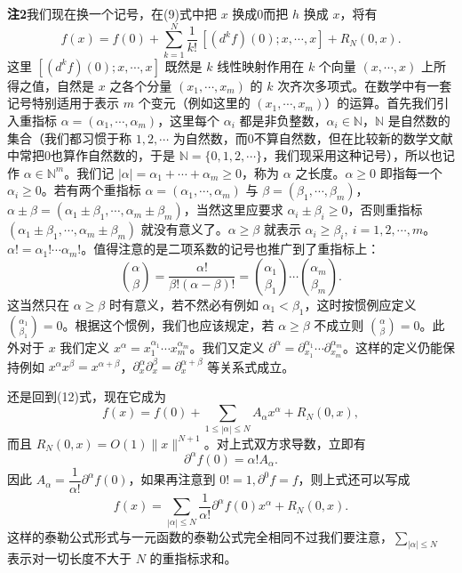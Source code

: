 \noindent\textbf{注2}\quad 我们现在换一个记号，在(9)式中把 $x$ 换成0而把 $h$ 换成 $x$，将有
\begin{equation}
 f(x)=f(0)+\sum_{k=1}^N\frac1{k!}\,[(d^kf)(0);x,\cdots,x]+R_N(0,x).
 \tag{12}
\end{equation}
这里 $[(d^kf)(0);x,\cdots,x]$ 既然是 $k$ 线性映射作用在 $k$ 个向量 $(x,\cdots,x)$ 上所得之值，自然是 $x$ 之各个分量 $(x_1,\cdots,x_m)$ 的 $k$ 次齐次多项式。在数学中有一套记号特别适用于表示 $m$ 个变元（例如这里的 $(x_1,\cdots,x_m)$）的运算。首先我们引入重指标 $\alpha=(\alpha_1,\cdots,\alpha_m)$，这里每个 $\alpha_i$ 都是非负整数，$\alpha_i\in\mathbb N$，$\mathbb N$ 是自然数的集合（我们都习惯于称 $1,2,\cdots$ 为自然数，而0不算自然数，但在比较新的数学文献中常把0也算作自然数的，于是 $\mathbb N=\{0,1,2,\cdots\}$，我们现采用这种记号），所以也记作 $\alpha\in\mathbb N^m$。我们记 $|\alpha|=\alpha_1+\cdots+\alpha_m\ge0$，称为 $\alpha$ 之长度。$\alpha\ge0$ 即指每一个 $\alpha_i\ge0$。若有两个重指标 $\alpha=(\alpha_1,\cdots,\alpha_m)$ 与 $\beta=(\beta_1,\cdots,\beta_m)$，$\alpha\pm\beta=(\alpha_1\pm\beta_1,\cdots,\alpha_m\pm\beta_m)$，当然这里应要求 $\alpha_i\pm\beta_i\ge0$，否则重指标 $(\alpha_1\pm\beta_1,\cdots,\alpha_m\pm\beta_m)$ 就没有意义了。$\alpha\ge\beta$ 就表示 $\alpha_i\ge\beta_i,\ i=1,2,\cdots,m$。$\alpha!=\alpha_1!\cdots\alpha_m!$。值得注意的是二项系数的记号也推广到了重指标上：
\[
 \binom{\alpha}{\beta}=\frac{\alpha!}{\beta!(\alpha-\beta)!}
 =\binom{\alpha_1}{\beta_1}\cdots\binom{\alpha_m}{\beta_m}.
\]
这当然只在 $\alpha\ge\beta$ 时有意义，若不然必有例如 $\alpha_1<\beta_1$，这时按惯例应定义 $\binom{\alpha_1}{\beta_1}=0$。根据这个惯例，我们也应该规定，若 $\alpha\ge\beta$ 不成立则 $\binom{\alpha}{\beta}=0$。此外对于 $x$ 我们定义 $x^\alpha=x_1^{\alpha_1}\cdots x_m^{\alpha_m}$。我们又定义 $\partial^\alpha=\partial_{x_1}^{\alpha_1}\cdots\partial_{x_m}^{\alpha_m}$。这样的定义仍能保持例如 $x^\alpha x^\beta=x^{\alpha+\beta}$，$\partial_x^\alpha\partial_x^\beta=\partial_x^{\alpha+\beta}$ 等关系式成立。

还是回到(12)式，现在它成为
\[
 f(x)=f(0)+\sum_{1\le|\alpha|\le N}A_\alpha x^\alpha+R_N(0,x),
\]
而且 $R_N(0,x)=O(1)\lVert x\rVert^{N+1}$。对上式双方求导数，立即有
\[
 \partial^\alpha f(0)=\alpha!A_\alpha.
\]
因此 $A_\alpha=\dfrac1{\alpha!}\partial^\alpha f(0)$，如果再注意到 $0!=1,\partial^0f=f$，则上式还可以写成
\begin{equation}
 f(x)=\sum_{|\alpha|\le N}\frac1{\alpha!}\partial^\alpha f(0)x^\alpha+R_N(0,x).
 \tag{13}
\end{equation}
这样的泰勒公式形式与一元函数的泰勒公式完全相同不过我们要注意，$\sum_{|\alpha|\le N}$ 表示对一切长度不大于 $N$ 的重指标求和。

